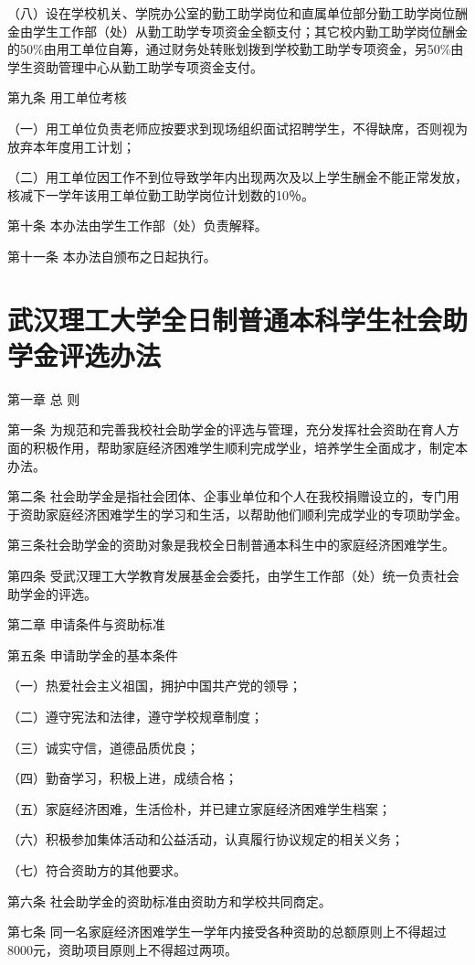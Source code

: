 \documentclass[UTF8,12pt,a4paper]{report}
\begin{document}
（八）设在学校机关、学院办公室的勤工助学岗位和直属单位部分勤工助学岗位酬金由学生工作部（处）从勤工助学专项资金全额支付；其它校内勤工助学岗位酬金的50\%由用工单位自筹，通过财务处转账划拨到学校勤工助学专项资金，另50\%由学生资助管理中心从勤工助学专项资金支付。

第九条 用工单位考核

（一）用工单位负责老师应按要求到现场组织面试招聘学生，不得缺席，否则视为放弃本年度用工计划；

（二）用工单位因工作不到位导致学年内出现两次及以上学生酬金不能正常发放，核减下一学年该用工单位勤工助学岗位计划数的10％。

第十条 本办法由学生工作部（处）负责解释。

第十一条 本办法自颁布之日起执行。

\chapter{武汉理工大学全日制普通本科学生社会助学金评选办法}
第一章 总 则

第一条 为规范和完善我校社会助学金的评选与管理，充分发挥社会资助在育人方面的积极作用，帮助家庭经济困难学生顺利完成学业，培养学生全面成才，制定本办法。

第二条 社会助学金是指社会团体、企事业单位和个人在我校捐赠设立的，专门用于资助家庭经济困难学生的学习和生活，以帮助他们顺利完成学业的专项助学金。

第三条社会助学金的资助对象是我校全日制普通本科生中的家庭经济困难学生。

第四条 受武汉理工大学教育发展基金会委托，由学生工作部（处）统一负责社会助学金的评选。

第二章 申请条件与资助标准

第五条 申请助学金的基本条件

（一）热爱社会主义祖国，拥护中国共产党的领导；

（二）遵守宪法和法律，遵守学校规章制度；

（三）诚实守信，道德品质优良；

（四）勤奋学习，积极上进，成绩合格；

（五）家庭经济困难，生活俭朴，并已建立家庭经济困难学生档案；

（六）积极参加集体活动和公益活动，认真履行协议规定的相关义务；

（七）符合资助方的其他要求。

第六条 社会助学金的资助标准由资助方和学校共同商定。

第七条 同一名家庭经济困难学生一学年内接受各种资助的总额原则上不得超过8000元，资助项目原则上不得超过两项。
\end{document}
